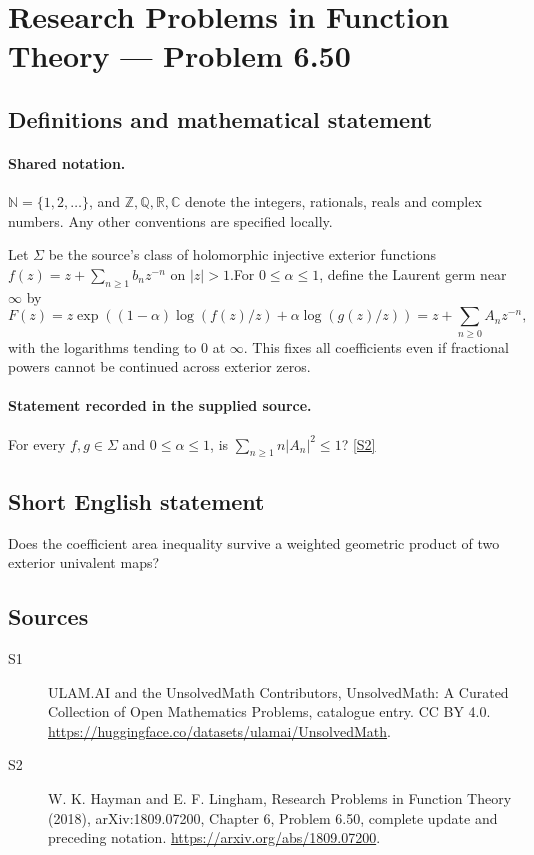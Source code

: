 \documentclass[11pt]{article}
\newcommand{\sref}[2]{\hyperlink{source:#1:#2}{[S#2]}}
\begin{document}
\section{Research Problems in Function Theory — Problem 6.50}\label{statement}

\subsection{Definitions and mathematical statement}

\paragraph{Shared notation.}$\mathbb N=\{1,2,\ldots\}$, and $\mathbb Z,\mathbb Q,\mathbb R,\mathbb C$ denote the integers, rationals, reals and complex numbers. Any other conventions are specified locally.


Let $\Sigma$ be the source's class of holomorphic injective exterior functions $f(z)=z+\sum_{n\ge1}b_nz^{-n}$ on $|z|>1$.For $0\le\alpha\le1$, define the Laurent germ near $\infty$ by
\[F(z)=z\exp\left((1-\alpha)\log(f(z)/z)+\alpha\log(g(z)/z)\right)=z+\sum_{n\ge0}A_nz^{-n},\]
with the logarithms tending to $0$ at $\infty$. This fixes all coefficients even if fractional powers cannot be continued across exterior zeros.
\paragraph{Statement recorded in the supplied source.}
For every $f,g\in\Sigma$ and $0\le\alpha\le1$, is $\sum_{n\ge1}n|A_n|^2\le1$? \sref{statement}{2}
\subsection{Short English statement}
Does the coefficient area inequality survive a weighted geometric product of two exterior univalent maps?
\subsection{Sources}
\begin{description}
\item[\hypertarget{source:statement:1}{S1}] ULAM.AI and the UnsolvedMath Contributors, UnsolvedMath: A Curated Collection of Open Mathematics Problems, catalogue entry. CC BY 4.0. \url{https://huggingface.co/datasets/ulamai/UnsolvedMath}.
\item[\hypertarget{source:statement:2}{S2}] W. K. Hayman and E. F. Lingham, Research Problems in Function Theory (2018), arXiv:1809.07200, Chapter 6, Problem 6.50, complete update and preceding notation. \url{https://arxiv.org/abs/1809.07200}.
\end{description}
\label{end:statement}
\end{document}
